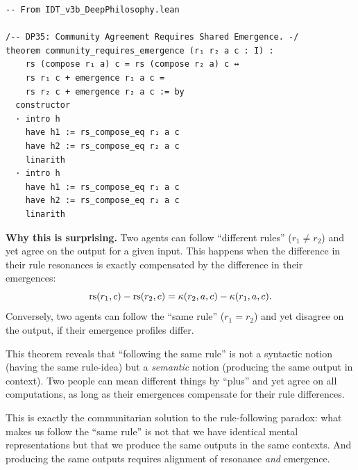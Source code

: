 \begin{lstlisting}
-- From IDT_v3b_DeepPhilosophy.lean

/-- DP35: Community Agreement Requires Shared Emergence. -/
theorem community_requires_emergence (r₁ r₂ a c : I) :
    rs (compose r₁ a) c = rs (compose r₂ a) c ↔
    rs r₁ c + emergence r₁ a c =
    rs r₂ c + emergence r₂ a c := by
  constructor
  · intro h
    have h1 := rs_compose_eq r₁ a c
    have h2 := rs_compose_eq r₂ a c
    linarith
  · intro h
    have h1 := rs_compose_eq r₁ a c
    have h2 := rs_compose_eq r₂ a c
    linarith
\end{lstlisting}

\begin{surprisebox}
\noindent\textbf{Why this is surprising.}
Two agents can follow ``different rules'' ($r_1 \neq r_2$) and yet
agree on the output for a given input.  This happens when the
difference in their rule resonances is exactly compensated by the
difference in their emergences:
\[
\mathrm{rs}(r_1, c) - \mathrm{rs}(r_2, c) = \kappa(r_2, a, c) - \kappa(r_1, a, c).
\]
Conversely, two agents can follow the ``same rule'' ($r_1 = r_2$) and
yet disagree on the output, if their emergence profiles differ.

This theorem reveals that ``following the same rule'' is not a
syntactic notion (having the same rule-idea) but a \emph{semantic}
notion (producing the same output in context).  Two people can mean
different things by ``plus'' and yet agree on all computations, as
long as their emergences compensate for their rule differences.

This is exactly the communitarian solution to the rule-following
paradox: what makes us follow the ``same rule'' is not that we
have identical mental representations but that we produce the
same outputs in the same contexts.  And producing the same outputs
requires alignment of resonance \emph{and} emergence.
\end{surprisebox}

